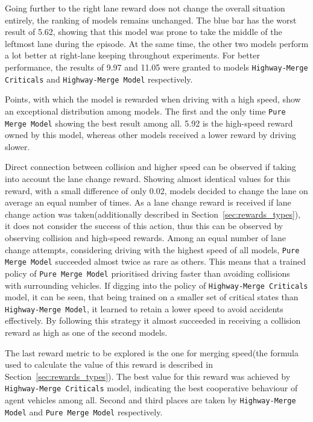 Going further to the right lane reward does not change the overall situation entirely, the ranking of models remains unchanged. The blue bar has the worst result of 5.62, showing that this model was prone to take the middle of the leftmost lane during the episode. At the same time, the other two models perform a lot better at right-lane keeping throughout experiments. For better performance, the results of 9.97 and 11.05 were granted to models \texttt{Highway-Merge Criticals} and \texttt{Highway-Merge Model} respectively. 

Points, with which the model is rewarded when driving with a high speed, show an exceptional distribution among models. The first and the only time \texttt{Pure Merge Model} showing the best result among all. 5.92 is the high-speed reward owned by this model, whereas other models received a lower reward by driving slower. 

Direct connection between collision and higher speed can be observed if taking into account the lane change reward. Showing almost identical values for this reward, with a small difference of only 0.02, models decided to change the lane on average an equal number of times. As a lane change reward is received if lane change action was taken(additionally described in Section~\ref{sec:rewards_types}), it does not consider the success of this action, thus this can be observed by observing collision and high-speed rewards. Among an equal number of lane change attempts, considering driving with the highest speed of all models, \texttt{Pure Merge Model} succeeded almost twice as rare as others. This means that a trained policy of \texttt{Pure Merge Model} prioritised driving faster than avoiding collisions with surrounding vehicles. If digging into the policy of \texttt{Highway-Merge Criticals} model, it can be seen, that being trained on a smaller set of critical states than \texttt{Highway-Merge Model}, it learned to retain a lower speed to avoid accidents effectively. By following this strategy it almost succeeded in receiving a collision reward as high as one of the second models. 

The last reward metric to be explored is the one for merging speed(the formula used to calculate the value of this reward is described in Section~\ref{sec:rewards_types}). The best value for this reward was achieved by \texttt{Highway-Merge Criticals} model, indicating the best cooperative behaviour of agent vehicles among all. Second and third places are taken by \texttt{Highway-Merge Model} and \texttt{Pure Merge Model} respectively. 

